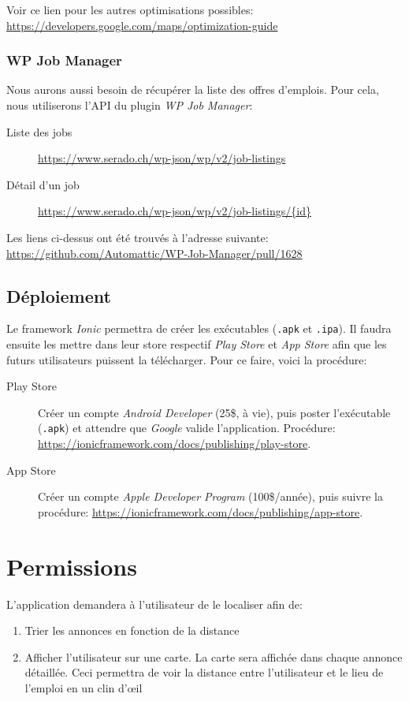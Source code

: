 \documentclass[french]{report}
\begin{document}
Voir ce lien pour les autres optimisations possibles: \url{https://developers.google.com/maps/optimization-guide}

\subsubsection{WP Job Manager}

Nous aurons aussi besoin de récupérer la liste des offres d'emplois. Pour cela, nous
utiliserons l'API du plugin \textit{WP Job Manager}:
\begin{description}
    \item[Liste des jobs] \url{https://www.serado.ch/wp-json/wp/v2/job-listings}
    \item[Détail d'un job] \url{https://www.serado.ch/wp-json/wp/v2/job-listings/{id}} 
\end{description}
\vspace{1em}

Les liens ci-dessus ont été trouvés à l'adresse suivante: \url{https://github.com/Automattic/WP-Job-Manager/pull/1628}

\subsection{Déploiement}

Le framework \textit{Ionic} permettra de créer les exécutables (\verb|.apk| et
\verb|.ipa|). Il faudra ensuite les mettre dans leur store respectif 
\textit{Play Store} et \textit{App Store} afin que les futurs utilisateurs puissent
la télécharger. Pour ce faire, voici la procédure:
\begin{description}
    \item[Play Store] Créer un compte \textit{Android Developer} (25\$, à vie), puis poster
    l'exécutable (\verb|.apk|) et attendre que \textit{Google} valide l'application.
    Procédure: \url{https://ionicframework.com/docs/publishing/play-store}.
    \item[App Store] Créer un compte \textit{Apple Developer Program} (100\$/année),
    puis suivre la procédure: \url{https://ionicframework.com/docs/publishing/app-store}.
\end{description}


\section{Permissions}
L'application demandera à l'utilisateur de le localiser afin de:
\begin{enumerate}
    \item Trier les annonces en fonction de la distance
    \item Afficher l'utilisateur sur une carte. La carte sera affichée dans chaque
    annonce détaillée. Ceci permettra de voir la distance entre l'utilisateur et le
    lieu de l'emploi en un clin d'\oe il
\end{enumerate}
\end{document}
